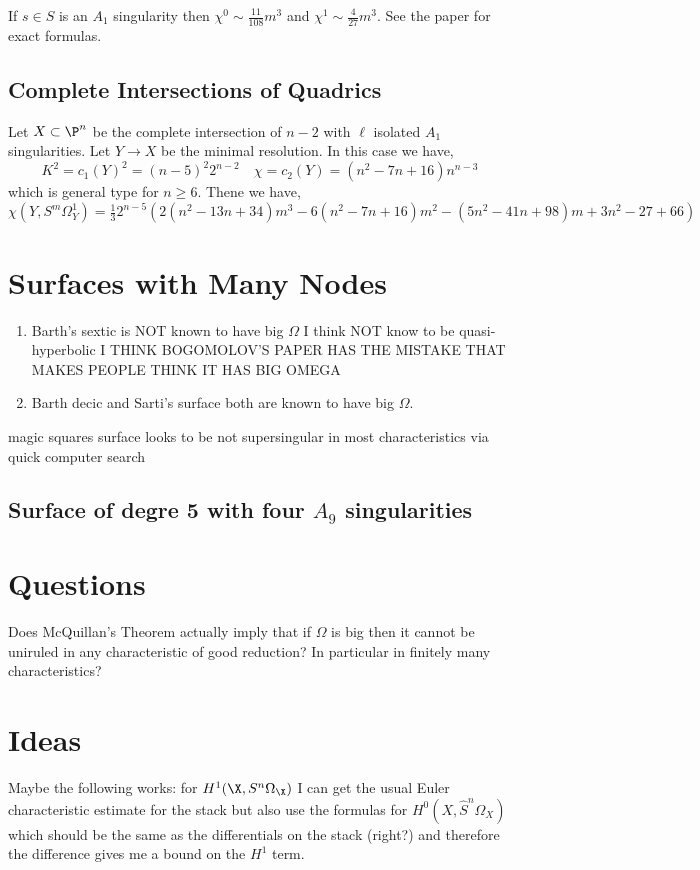 \documentclass[12pt]{article}
\begin{document}
\begin{theorem}
If $s \in S$ is an $A_1$ singularity then $\chi^0 \sim \frac{11}{108} m^3$ and $\chi^1 \sim \frac{4}{27} m^3$. See the paper for exact formulas. 
\end{theorem}


\subsection{Complete Intersections of Quadrics}

Let $X \subset \P^n$ be the complete intersection of $n - 2$ with $\ell$ isolated $A_1$ singularities. Let $Y \to X$ be the minimal resolution. In this case we have,
\[ K^2 = c_1(Y)^2 = (n - 5)^2 2^{n-2} \quad \chi = c_2(Y) = (n^2 - 7n + 16)n^{n-3} \]
which is general type for $n \ge 6$.  Thene we have,
\[ \chi(Y, S^m \Omega_Y^1) = \tfrac{1}{3} 2^{n-5} (2 (n^2 - 13 n + 34) m^3 - 6(n^2 - 7n + 16) m^2 - (5 n^2 - 41 n + 98) m + 3 n^2 - 27 + 66) \]


\section{Surfaces with Many Nodes}

\begin{enumerate}
\item Barth's sextic is NOT known to have big $\Omega$ I think NOT know to be quasi-hyperbolic {\color{red} I THINK BOGOMOLOV'S PAPER HAS THE MISTAKE THAT MAKES PEOPLE THINK IT HAS BIG OMEGA}

\item Barth decic and Sarti's surface both are known to have big $\Omega$.
\end{enumerate}


{\color{red} magic squares surface looks to be not supersingular in most characteristics via quick computer search}



\subsection{Surface of degre 5 with four $A_9$ singularities}


\section{Questions}

Does McQuillan's Theorem actually imply that if $\Omega$ is big then it cannot be uniruled in any characteristic of good reduction? In particular in finitely many characteristics? 


\section{Ideas}

Maybe the following works: for $H^1(\X, S^n \Omega_{\X})$ I can get the usual Euler characteristic estimate for the stack but also use the formulas for $H^0(X, \hat{S}^n \Omega_X)$ which should be the same as the differentials on the stack (right?) and therefore the difference gives me a bound on the $H^1$ term. 
\end{document}
